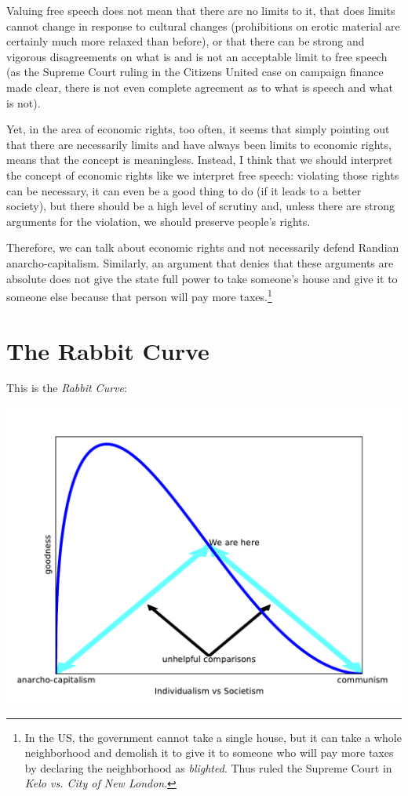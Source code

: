 Valuing free speech does not mean that there are no limits to it, that does
limits cannot change in response to cultural changes (prohibitions on erotic
material are certainly much more relaxed than before), or that there can be
strong and vigorous disagreements on what is and is not an acceptable limit to
free speech (as the Supreme Court ruling in the Citizens United case on
campaign finance made clear, there is not even complete agreement as to what is
speech and what is not).

Yet, in the area of economic rights, too often, it seems that simply pointing
out that there are necessarily limits and have always been limits to economic
rights, means that the concept is meaningless. Instead, I think that we should
interpret the concept of economic rights like we interpret free speech:
violating those rights can be necessary, it can even be a good thing to do (if
it leads to a better society), but there should be a high level of scrutiny
and, unless there are strong arguments for the violation, we should preserve
people's rights.

Therefore, we can talk about economic rights and not necessarily defend Randian
anarcho-capitalism. Similarly, an argument that denies that these arguments are
absolute does not give the state full power to take someone's house and give it
to someone else because that person will pay more taxes.\footnote{In the US,
the government cannot take a single house, but it can take a whole neighborhood
and demolish it to give it to someone who will pay more taxes by declaring the
neighborhood as \emph{blighted}. Thus ruled the Supreme Court in \emph{Kelo vs.
City of New London}.}

\section{The Rabbit Curve}

This is the \emph{Rabbit Curve}:

\includegraphics[width=.8\textwidth]{images/rabbit-curve.pdf}

